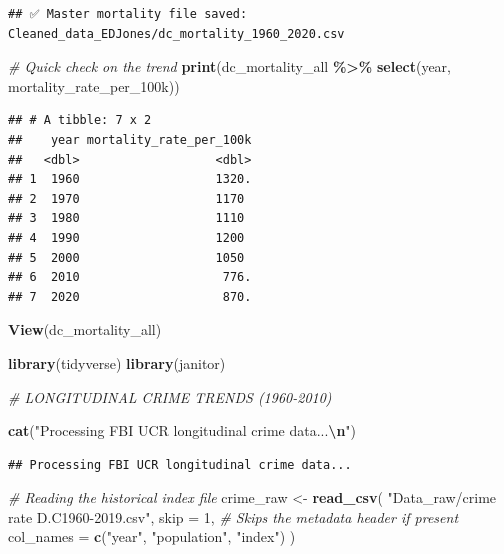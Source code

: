 \documentclass[
]{article}
\newenvironment{Shaded}{\begin{snugshade}}{\end{snugshade}}
\newcommand{\AttributeTok}[1]{\textcolor[rgb]{0.13,0.29,0.53}{#1}}
\newcommand{\CommentTok}[1]{\textcolor[rgb]{0.56,0.35,0.01}{\textit{#1}}}
\newcommand{\DecValTok}[1]{\textcolor[rgb]{0.00,0.00,0.81}{#1}}
\newcommand{\FunctionTok}[1]{\textcolor[rgb]{0.13,0.29,0.53}{\textbf{#1}}}
\newcommand{\NormalTok}[1]{#1}
\newcommand{\OtherTok}[1]{\textcolor[rgb]{0.56,0.35,0.01}{#1}}
\newcommand{\SpecialCharTok}[1]{\textcolor[rgb]{0.81,0.36,0.00}{\textbf{#1}}}
\newcommand{\StringTok}[1]{\textcolor[rgb]{0.31,0.60,0.02}{#1}}
\begin{document}
\begin{verbatim}
## ✅ Master mortality file saved: Cleaned_data_EDJones/dc_mortality_1960_2020.csv
\end{verbatim}

\begin{Shaded}
\begin{Highlighting}[]
\CommentTok{\# Quick check on the trend}
\FunctionTok{print}\NormalTok{(dc\_mortality\_all }\SpecialCharTok{\%\textgreater{}\%} \FunctionTok{select}\NormalTok{(year, mortality\_rate\_per\_100k))}
\end{Highlighting}
\end{Shaded}

\begin{verbatim}
## # A tibble: 7 x 2
##    year mortality_rate_per_100k
##   <dbl>                   <dbl>
## 1  1960                   1320.
## 2  1970                   1170 
## 3  1980                   1110 
## 4  1990                   1200 
## 5  2000                   1050 
## 6  2010                    776.
## 7  2020                    870.
\end{verbatim}

\begin{Shaded}
\begin{Highlighting}[]
\FunctionTok{View}\NormalTok{(dc\_mortality\_all)}
\end{Highlighting}
\end{Shaded}

\begin{Shaded}
\begin{Highlighting}[]
\FunctionTok{library}\NormalTok{(tidyverse)}
\FunctionTok{library}\NormalTok{(janitor)}


\CommentTok{\# LONGITUDINAL CRIME TRENDS (1960{-}2010)}

\FunctionTok{cat}\NormalTok{(}\StringTok{"Processing FBI UCR longitudinal crime data...}\SpecialCharTok{\textbackslash{}n}\StringTok{"}\NormalTok{)}
\end{Highlighting}
\end{Shaded}

\begin{verbatim}
## Processing FBI UCR longitudinal crime data...
\end{verbatim}

\begin{Shaded}
\begin{Highlighting}[]
\CommentTok{\# Reading the historical index file}
\NormalTok{crime\_raw }\OtherTok{\textless{}{-}} \FunctionTok{read\_csv}\NormalTok{(}
  \StringTok{"Data\_raw/crime rate D.C1960{-}2019.csv"}\NormalTok{,}
  \AttributeTok{skip =} \DecValTok{1}\NormalTok{, }\CommentTok{\# Skips the metadata header if present}
  \AttributeTok{col\_names =} \FunctionTok{c}\NormalTok{(}\StringTok{"year"}\NormalTok{, }\StringTok{"population"}\NormalTok{, }\StringTok{"index"}\NormalTok{)}
\NormalTok{)}
\end{Highlighting}
\end{Shaded}
\end{document}
